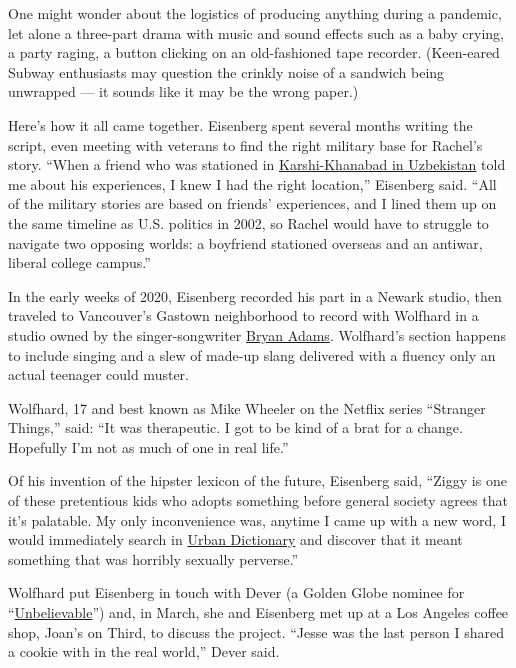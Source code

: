 One might wonder about the logistics of producing anything during a
pandemic, let alone a three-part drama with music and sound effects such
as a baby crying, a party raging, a button clicking on an old-fashioned
tape recorder. (Keen-eared Subway enthusiasts may question the crinkly
noise of a sandwich being unwrapped --- it sounds like it may be the
wrong paper.)

Here's how it all came together. Eisenberg spent several months writing
the script, even meeting with veterans to find the right military base
for Rachel's story. ``When a friend who was stationed in
\href{https://www.nytimes3xbfgragh.onion/2005/07/31/world/uzbeks-order-us-from-base-in-refugee-rift.html}{Karshi-Khanabad
in Uzbekistan} told me about his experiences, I knew I had the right
location,'' Eisenberg said. ``All of the military stories are based on
friends' experiences, and I lined them up on the same timeline as U.S.
politics in 2002, so Rachel would have to struggle to navigate two
opposing worlds: a boyfriend stationed overseas and an antiwar, liberal
college campus.''

In the early weeks of 2020, Eisenberg recorded his part in a Newark
studio, then traveled to Vancouver's Gastown neighborhood to record with
Wolfhard in a studio owned by the singer-songwriter
\href{https://www.nytimes3xbfgragh.onion/1994/03/08/arts/review-pop-bryan-adams-more-mr-nice-guy.html}{Bryan
Adams}. Wolfhard's section happens to include singing and a slew of
made-up slang delivered with a fluency only an actual teenager could
muster.

Wolfhard, 17 and best known as Mike Wheeler on the Netflix series
``Stranger Things,'' said: ``It was therapeutic. I got to be kind of a
brat for a change. Hopefully I'm not as much of one in real life.''

Of his invention of the hipster lexicon of the future, Eisenberg said,
``Ziggy is one of these pretentious kids who adopts something before
general society agrees that it's palatable. My only inconvenience was,
anytime I came up with a new word, I would immediately search in
\href{https://www.nytimes3xbfgragh.onion/2009/07/05/magazine/05FOB-medium-t.html}{Urban
Dictionary} and discover that it meant something that was horribly
sexually perverse.''

Wolfhard put Eisenberg in touch with Dever (a Golden Globe nominee for
``\href{https://www.nytimes3xbfgragh.onion/2019/09/13/arts/television/review-netflix-unbelievable.html}{Unbelievable}'')
and, in March, she and Eisenberg met up at a Los Angeles coffee shop,
Joan's on Third, to discuss the project. ``Jesse was the last person I
shared a cookie with in the real world,'' Dever said.

